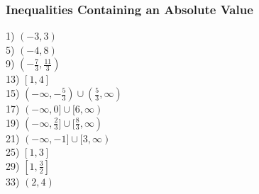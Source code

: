 \documentclass[12pt]{book}
\theoremstyle{definition}
\begin{document}
\subsubsection*{Inequalities Containing an Absolute Value}
\begin{multicols}{3}
1) $(-3,3)$\\
5) $(-4,8)$\\
9) $(-\frac{7}{3},\frac{11}{3})$\\
13) $[1,4]$\\
15) $(-\infty,-\frac{5}{3})\cup(\frac{5}{3},\infty)$\\
17) $(-\infty,0]\cup[6,\infty)$\\
19) $(-\infty,\frac{2}{3}]\cup[\frac{8}{3},\infty)$\\
21) $(-\infty,-1]\cup[3,\infty)$\\
25) $[1,3]$\\
29) $[1,\frac{3}{2}]$\\
33) $(2,4)$
\end{multicols}
\end{document}
